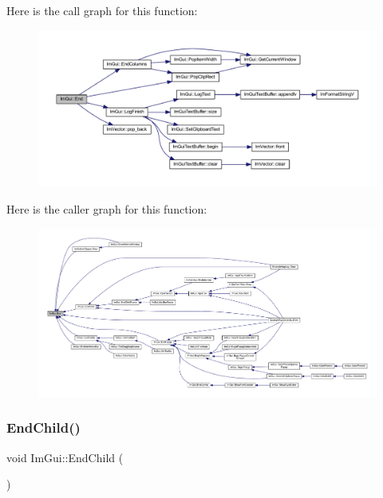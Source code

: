 Here is the call graph for this function\+:
\nopagebreak
\begin{figure}[H]
\begin{center}
\leavevmode
\includegraphics[width=350pt]{namespace_im_gui_a5479d93794a004c67ceb6d13f37c8254_cgraph}
\end{center}
\end{figure}
Here is the caller graph for this function\+:
\nopagebreak
\begin{figure}[H]
\begin{center}
\leavevmode
\includegraphics[width=350pt]{namespace_im_gui_a5479d93794a004c67ceb6d13f37c8254_icgraph}
\end{center}
\end{figure}
\mbox{\label{namespace_im_gui_af8de559a88c1442d6df8c1b04c86e997}} 
\subsubsection{\texorpdfstring{End\+Child()}{EndChild()}}
{\footnotesize\ttfamily void Im\+Gui\+::\+End\+Child (\begin{DoxyParamCaption}{ }\end{DoxyParamCaption})}

